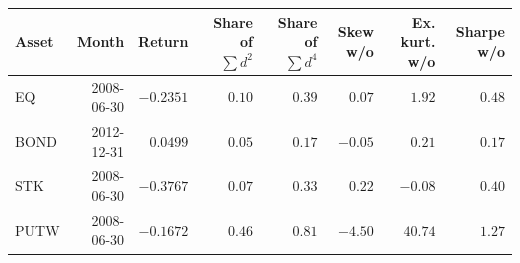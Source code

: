 \begin{tabular}{lrrrrrrr}
\toprule
Asset & Month & Return & Share of $\sum d^2$ & Share of $\sum d^4$ & Skew w/o & Ex. kurt. w/o & Sharpe w/o \\
\midrule
EQ & 2008-06-30 & $-0.2351$ & $0.10$ & $0.39$ & $0.07$ & $1.92$ & $0.48$ \\
BOND & 2012-12-31 & $0.0499$ & $0.05$ & $0.17$ & $-0.05$ & $0.21$ & $0.17$ \\
STK & 2008-06-30 & $-0.3767$ & $0.07$ & $0.33$ & $0.22$ & $-0.08$ & $0.40$ \\
PUTW & 2008-06-30 & $-0.1672$ & $0.46$ & $0.81$ & $-4.50$ & $40.74$ & $1.27$ \\
\bottomrule
\end{tabular}
